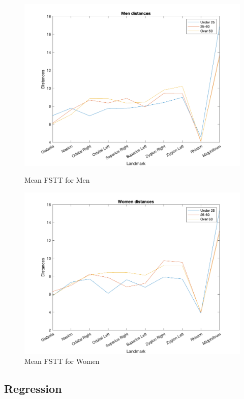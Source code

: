 \documentclass[journal,article,submit,pdftex,moreauthors]{Definitions/mdpi}
\begin{document}
\begin{figure}[H]
\begin{minipage}{0.5\textwidth}
\centering
\includegraphics[width=1\linewidth]{Definitions/Men_distances_after_cleaning.png}
\caption{Mean FSTT for Men}
\label{fig4}
\end{minipage}%
\begin{minipage}{0.5\textwidth}
\centering
\includegraphics[width=1\linewidth]{Definitions/Women_distances_after_cleaning.png}
\caption{Mean FSTT for Women}
\label{fig5}
\end{minipage}
\end{figure}
 

\subsection*{Regression}
\end{document}
